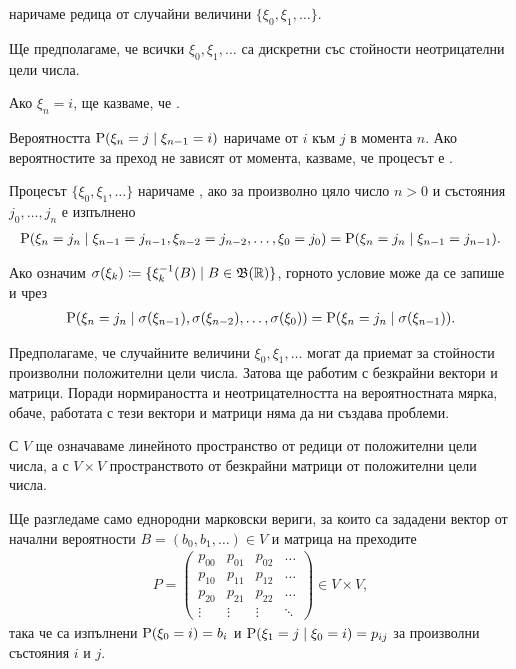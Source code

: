 \documentclass[numbers=endperiod, bibliography=totocnumbered]{scrartcl}
\begin{document}
\begin{definition}
   наричаме редица от случайни величини \( \{ \xi_0, \xi_1, \ldots \} \).

  Ще предполагаме, че всички \( \xi_0, \xi_1, \ldots \) са дискретни със стойности неотрицателни цели числа.

  Ако \( \xi_n = i \), ще казваме, че .

  Вероятността \( \operatorname{P}(\xi_n = j \mid \xi_{n-1} = i) \) наричаме  от \( i \) към \( j \) в момента \( n \). Ако вероятностите за преход не зависят от момента, казваме, че процесът е .

  Процесът \( \{ \xi_0, \xi_1, \ldots \} \) наричаме , ако за произволно цяло число \( n > 0 \) и състояния \( j_0, \ldots, j_n \) е изпълнено
  \begin{align*}
    \operatorname{P}(\xi_n = j_n \mid \xi_{n-1} = j_{n-1}, \xi_{n-2} = j_{n-2}, \ldots, \xi_0 = j_0) = \operatorname{P}(\xi_n = j_n \mid \xi_{n-1} = j_{n-1}).
  \end{align*}

  Ако означим \( \sigma(\xi_k) \coloneqq \{ \xi_k^{-1}(B) \mid B \in \mathfrak{B}(\mathbb{R}) \} \), горното условие може да се запише и чрез
  \begin{align*}
    \operatorname{P}(\xi_n = j_n \mid \sigma(\xi_{n-1}), \sigma(\xi_{n-2}), \ldots, \sigma(\xi_0)) = \operatorname{P}(\xi_n = j_n \mid \sigma(\xi_{n-1})).
  \end{align*}
\end{definition}

\begin{note}
  Предполагаме, че случайните величини \( \xi_0, \xi_1, \ldots \) могат да приемат за стойности произволни положителни цели числа. Затова ще работим с безкрайни вектори и матрици. Поради нормираността и неотрицателността на вероятностната мярка, обаче, работата с тези вектори и матрици няма да ни създава проблеми.
\end{note}

С \( V \) ще означаваме линейното пространство от редици от положителни цели числа, а с \( V \times V \) пространството от безкрайни матрици от положителни цели числа.

Ще разгледаме само еднородни марковски вериги, за които са зададени вектор от начални вероятности \( B = (b_0, b_1, \ldots) \in V \) и матрица на преходите
\begin{align*}
  P = \begin{pmatrix}
    p_{00} & p_{01} & p_{02} & \ldots \\
    p_{10} & p_{11} & p_{12} & \ldots \\
    p_{20} & p_{21} & p_{22} & \ldots \\
    \vdots & \vdots & \vdots & \ddots
  \end{pmatrix} \in V \times V,
\end{align*}
така че са изпълнени \( \operatorname{P}(\xi_0 = i) = b_i \) и \( \operatorname{P}(\xi_1 = j \mid \xi_0 = i) = p_{ij} \) за произволни състояния \( i \) и \( j \).
\end{document}
